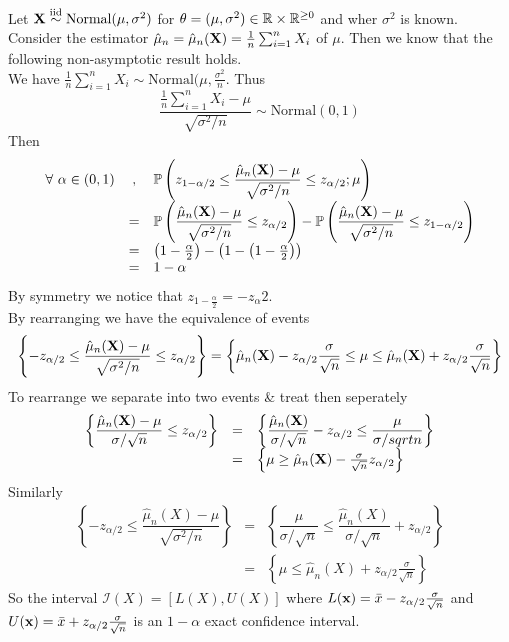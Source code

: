 \documentclass[11pt,a4paper]{article}
\begin{document}
Let $\textbf{X}\overset{\text{iid}}{\sim}\text{Normal}(\mu,\sigma^2)$ for $\theta=(\mu,\sigma^2)\in\mathbb{R}\times\mathbb{R}^{\geq0}$ and wher $\sigma^2$ is known.\\
Consider the estimator $\hat{\mu}_n=\hat{\mu}_n(\textbf{X})=\frac{1}{n}\sum_{i=1}^nX_i$ of $\mu$. Then we know that the following non-asymptotic result holds.\\
We have $\frac{1}{n}\sum_{i=1}^nX_i\sim\text{Normal}(\mu,\frac{\sigma^2}{n}$. Thus
$$\dfrac{\frac{1}{n}\sum_{i=1}^nX_i-\mu}{\sqrt{\sigma^2/n}}\sim\text{Normal}(0,1)$$
Then
\[\begin{array}{rcl}
\forall\ \alpha\in(0,1)&,&\prob\left(z_{1-\alpha/2}\leq\dfrac{\hat{\mu}_n(\X)-\mu}{\sqrt{\sigma^2/n}}\leq z_{\alpha/2};\mu\right)\\
&=&\prob\left(\dfrac{\hat{\mu}_n(\X)-\mu}{\sqrt{\sigma^2/n}}\leq z_{\alpha/2}\right)-\prob\left(\dfrac{\hat{\mu}_n(\X)-\mu}{\sqrt{\sigma^2/n}}\leq z_{1-\alpha/2}\right)\\
&=&\left(1-\frac{\alpha}{2}\right)-\left(1-\left(1-\frac{\alpha}{2}\right)\right)\\
&=&1-\alpha
\end{array}\]
By symmetry we notice that $z_{1-\frac{\alpha}{2}}=-z_{\alpha}{2}$.\\
By rearranging we have the equivalence of events
$$\left\{-z_{\alpha/2}\leq\frac{\hat{\mu}_n(\textbf{X})-\mu}{\sqrt{\sigma^2/n}}\leq z_{\alpha/2}\right\}=\left\{\hat{\mu}_n(\textbf{X})-z_{\alpha/2}\frac{\sigma}{\sqrt{n}}\leq\mu\leq\hat{\mu}_n(\textbf{X})+z_{\alpha/2}\frac{\sigma}{\sqrt{n}}\right\}$$
To rearrange we separate into two events \& treat then seperately
\[\begin{array}{rcl}
\left\{\dfrac{\hat{\mu}_n(\textbf{X})-\mu}{\sigma/\sqrt{n}}\leq z_{\alpha/2}\right\}&=&\left\{\dfrac{\hat{\mu}_n(\textbf{X})}{\sigma/\sqrt{n}}-z_{\alpha/2}\leq\dfrac{\mu}{\sigma/sqrt{n}}\right\}\\
&=&\left\{\mu\geq\hat{\mu}_n(\textbf{X})-\frac{\sigma}{\sqrt{n}}z_{\alpha/2}\right\}
\end{array}\]
Similarly
\[\begin{array}{rcl}
\left\{-z_{\alpha/2}\leq\dfrac{\hat{\mu}_n(X)-\mu}{\sqrt{\sigma^2/n}}\right\}&=&\left\{\dfrac{\mu}{\sigma/\sqrt{n}}\leq\dfrac{\hat{\mu}_n(X)}{\sigma/\sqrt{n}}+z_{\alpha/2}\right\}\\
&=&\left\{\mu\leq\hat{\mu}_n(X)+z_{\alpha/2}\frac{\sigma}{\sqrt{n}}\right\}
\end{array}\]
So the interval $\mathcal{I}(X)=[L(X),U(X)]$ where $L(\textbf{x})=\bar{x}-z_{\alpha/2}\frac{\sigma}{\sqrt{n}}$ and $U(\textbf{x})=\bar{x}+z_{\alpha/2}\frac{\sigma}{\sqrt{n}}$ is an $1-\alpha$ exact confidence interval.\\
\end{document}
